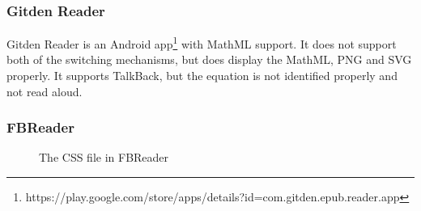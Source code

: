 \subsubsection{Gitden Reader}

Gitden Reader is an Android app\footnote{https://play.google.com/store/apps/details?id=com.gitden.epub.reader.app} with MathML support. It does not support both of the switching mechanisms, but does display the MathML, PNG and SVG properly. It supports TalkBack, but the equation is not identified properly and not read aloud.

\subsubsection{FBReader}
\begin{figure}[H]
	\centering
	\caption{The CSS file in FBReader}
	\label{fig:fbreader}
\end{figure}

